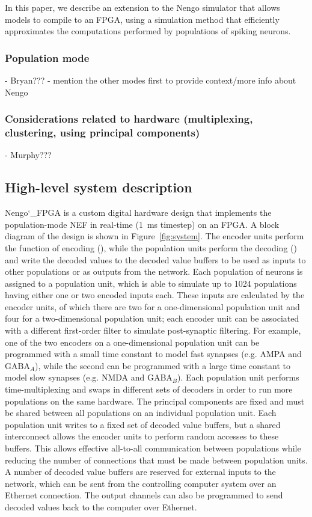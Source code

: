 \documentclass[english]{article}
\newcommand{\design}{Nengo\char`_FPGA}  %
\begin{document}
In this paper, we describe an extension to the Nengo simulator that allows models to compile to an FPGA, using a simulation method that efficiently approximates the computations performed by populations of spiking neurons.

\subsubsection{Population mode}

- Bryan???
- mention the other modes first to provide context/more info about Nengo

\subsubsection{Considerations related to hardware (multiplexing, clustering, using principal components)}

- Murphy???


\subsection{High-level system description}

\design{} is a custom digital hardware design that implements the population-mode NEF in real-time (1~ms timestep) on an FPGA.
A block diagram of the design is shown in Figure~\ref{fig:system}.
The encoder units perform the function of encoding (), %
while the population units perform the decoding () %
and write the decoded values to the decoded value buffers
to be used as inputs to other populations or as outputs from the network.
Each population of neurons is assigned to a population unit, which is able to simulate up to 1024 populations
having either one or two encoded inputs each. These inputs are calculated by the encoder units,
of which there are two for a one-dimensional population unit and four for a two-dimensional population unit;
each encoder unit can be associated with a different first-order filter to simulate post-synaptic filtering.
For example, one of the two encoders on a one-dimensional population unit can be programmed with
a small time constant to model fast synapses (e.g. AMPA and GABA$_A$), while the second can be programmed
with a large time constant to model slow synapses (e.g. NMDA and GABA$_B$).
Each population unit performs time-multiplexing and swaps in different sets of decoders
in order to run more populations on the same hardware. The principal components are fixed and must be shared
between all populations on an individual population unit.
Each population unit writes to a fixed set of decoded value buffers, but a shared interconnect
allows the encoder units to perform random accesses to these buffers.
This allows effective all-to-all communication between populations while reducing the number of 
connections that must be made between population units.
A number of decoded value buffers are reserved for external inputs to the network,
which can be sent from the controlling computer system over an Ethernet connection.
The output channels can also be programmed to send decoded values back to the computer over Ethernet.
\end{document}
